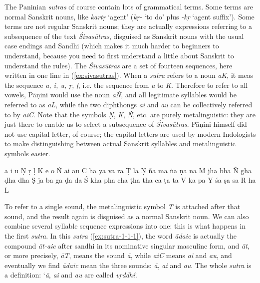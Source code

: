 \documentclass[a4paper, oneside, 12pt]{report}
\newcommand{\form}[1]{\emph{#1}}
\newcommand{\translate}[1]{`#1'}
\begin{document}
The Paninian \form{sutras} of course contain lots of grammatical terms.
Some terms are normal Sanskrit nouns,
like \form{kartṛ} \translate{agent} 
(\form{kṛ-} \translate{to do} plus \form{-kṛ} \translate{agent suffix}).
Some terms are not regular Sanskrit nouns;
they are actually expressions referring to a subsequence of the text \form{Śivasūtras},
disguised as Sanskrit nouns with the usual case endings and Sandhi 
(which makes it much harder to beginners to understand,
because you need to first understand a little about Sanskrit to understand the rules).
The \form{Śivasūtras} are a set of fourteen sequences,
here written in one line in (\ref{ex:sivasutras}).
When a \form{sutra} refers to a noun \form{aK},
it meas the sequence \form{a, i, u, ṛ, ḷ},
i.e. the sequence from \form{a} to \form{K}.
Therefore to refer to all vowels, Pāṇini would use the noun \form{aṄ},
and all legitimate syllables would be referred to as \form{aL},
while the two diphthongs \form{ai} and \form{au} can be collectively referred to by \form{aiC}.
Note that the symbols \form{Ṇ}, \form{K}, \form{Ṅ}, etc.
are purely metalinguistic: 
they are just there to enable us to select a subsequence of \form{Śivasūtras}.
Pāṇini himself did not use capital letter, of course;
the capital letters are used by modern Indologists to make distinguishing between actual Sanskrit syllables and metalinguistic symbols easier.

\begin{exe}
    \ex\label{ex:sivasutras} a i u Ṇ
    ṛ ḷ K
    e o Ṅ
    ai au C
    ha ya va ra Ṭ
    la Ṇ
    ña ma ṅa ṇa na M
    jha bha Ñ
    gha ḍha dha Ṣ
    ja ba ga ḍa da Ś
    kha pha cha ṭha tha ca ṭa ta V
    ka pa Y
    śa ṣa sa R
    ha L
\end{exe}


To refer to a single sound, the metalinguistic symbol \form{T} is attached after that sound,
and the result again is disguised as a normal Sanskrit noun.
We can also combine several syllable sequence expressions into one:
this is what happens in the first \form{sutra}.
In this \form{sutra} (\ref{ex:sutra-1-1-1}),
the word \form{ādaic} is actually the compound \form{āt-aic} after sandhi 
in its nominative singular masculine form,
and \form{āt}, or more precisely, \form{āT}, means the sound \form{ā}, 
while \form{aiC} means \form{ai} and \form{au},
and eventually we find \form{ādaic} mean the three sounds: \form{ā}, \form{ai} and \form{au}.
The whole \form{sutra} is a definition:
\translate{\form{ā}, \form{ai} and \form{au} are called \form{vṛddhi}}.
\end{document}
